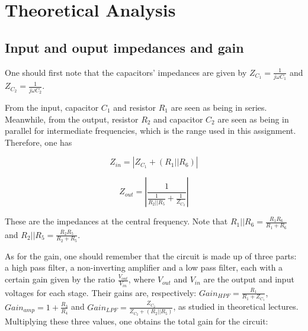 \section{Theoretical Analysis}
\label{sec:analysis}



\subsection{Input and ouput impedances and gain}

One should first note that the capacitors' impedances are given by $Z_{C_1} = \frac{1}{j \omega C_1}$ and $Z_{C_2} = \frac{1}{j \omega C_2}$.



From the input, capacitor $C_1$ and resistor $R_1$ are seen as being in series. Meanwhile, from the output, resistor $R_2$ and capacitor $C_2$ are seen as being in parallel for intermediate frequencies, which is the range used in this assignment. Therefore, one has

\begin{equation}
Z_{in} = |Z_{C_1} + (R_1||R_6)|
\end{equation}

\begin{equation}
Z_{out} = \left|\frac{1}{\frac{1}{R_2 || R_5} + \frac{1}{Z_{C_2}}}\right|
\end{equation}

These are the impedances at the central frequency. Note that $R_1||R_6 = \frac{R_1 R_6}{R_1 + R_6}$ and $R_2||R_5 = \frac{R_2 R_5}{R_2 + R_5}$.




As for the gain, one should remember that the circuit is made up of three parts: a high pass filter, a non-inverting amplifier and a low pass filter, each with a certain gain given by the ratio $\frac{V_{out}}{V_{in}}$, where $V_{out}$ and $V_{in}$ are the output and input voltages for each stage. Their gains are, respectively: $Gain_{HPF} = \frac{R_1}{R_1 + Z_{C_1}}$, $Gain_{amp} = 1+\frac{R_3}{R_4}$ and $Gain_{LPF} = \frac{Z_{C_2}}{Z_{C_2}+(R_2||R_5)}$, as studied in theoretical lectures. Multiplying these three values, one obtains the total gain for the circuit:

